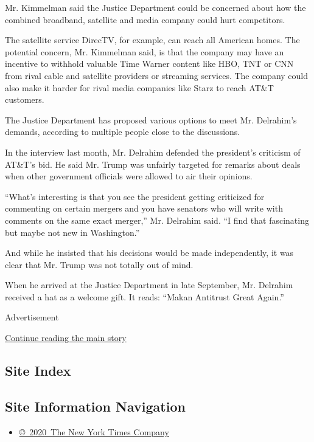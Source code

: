 Mr. Kimmelman said the Justice Department could be concerned about how
the combined broadband, satellite and media company could hurt
competitors.

The satellite service DirecTV, for example, can reach all American
homes. The potential concern, Mr. Kimmelman said, is that the company
may have an incentive to withhold valuable Time Warner content like HBO,
TNT or CNN from rival cable and satellite providers or streaming
services. The company could also make it harder for rival media
companies like Starz to reach AT\&T customers.

The Justice Department has proposed various options to meet Mr.
Delrahim's demands, according to multiple people close to the
discussions.

In the interview last month, Mr. Delrahim defended the president's
criticism of AT\&T's bid. He said Mr. Trump was unfairly targeted for
remarks about deals when other government officials were allowed to air
their opinions.

``What's interesting is that you see the president getting criticized
for commenting on certain mergers and you have senators who will write
with comments on the same exact merger,'' Mr. Delrahim said. ``I find
that fascinating but maybe not new in Washington.''

And while he insisted that his decisions would be made independently, it
was clear that Mr. Trump was not totally out of mind.

When he arrived at the Justice Department in late September, Mr.
Delrahim received a hat as a welcome gift. It reads: ``Makan Antitrust
Great Again.''

Advertisement

\protect\hyperlink{after-bottom}{Continue reading the main story}

\hypertarget{site-index}{%
\subsection{Site Index}\label{site-index}}

\hypertarget{site-information-navigation}{%
\subsection{Site Information
Navigation}\label{site-information-navigation}}

\begin{itemize}
\tightlist
\item
  \href{https://help.nytimes.com/hc/en-us/articles/115014792127-Copyright-notice}{©~2020~The
  New York Times Company}
\end{itemize}


